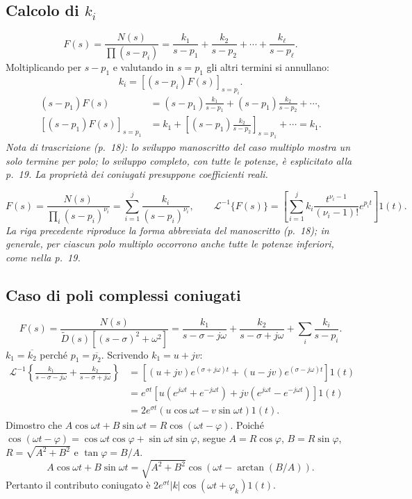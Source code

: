 \subsection*{Calcolo di $k_i$}
\[F(s)=\frac{N(s)}{\prod(s-p_i)}=\frac{k_1}{s-p_1}+\frac{k_2}{s-p_2}+\cdots+\frac{k_\ell}{s-p_\ell}.\]
Moltiplicando per $s-p_1$ e valutando in $s=p_1$ gli altri termini si annullano:
\[k_i=\left[(s-p_i)F(s)\right]_{s=p_i}.\]
\begin{align*}
(s-p_1)F(s)&=(s-p_1)\frac{k_1}{s-p_1}
 +(s-p_1)\frac{k_2}{s-p_2}+\cdots,\\
\left[(s-p_1)F(s)\right]_{s=p_1}
&=k_1+\left[(s-p_1)\frac{k_2}{s-p_2}\right]_{s=p_1}+\cdots=k_1.
\end{align*}
\emph{Nota di trascrizione (p.~18): lo sviluppo manoscritto del caso multiplo mostra un solo termine per polo; lo sviluppo completo, con tutte le potenze, è esplicitato alla p.~19. La proprietà dei coniugati presuppone coefficienti reali.}

\[F(s)=\frac{N(s)}{\prod_i(s-p_i)^{\nu_i}}
=\sum_{i=1}^j\frac{k_i}{(s-p_i)^{\nu_i}},\qquad
\mathcal L^{-1}\{F(s)\}=\left[\sum_{i=1}^j k_i\frac{t^{\nu_i-1}}{(\nu_i-1)!}e^{p_it}\right]1(t).\]
\emph{La riga precedente riproduce la forma abbreviata del manoscritto (p.~18); in generale, per ciascun polo multiplo occorrono anche tutte le potenze inferiori, come nella p.~19.}
\subsection*{Caso di poli complessi coniugati}
\[F(s)=\frac{N(s)}{\widetilde D(s)[(s-\sigma)^2+\omega^2]}=\frac{k_1}{s-\sigma-j\omega}+\frac{k_2}{s-\sigma+j\omega}+\sum_i\frac{k_i}{s-p_i}.\]
$k_1=\overline{k_2}$ perché $p_1=\overline{p_2}$. Scrivendo $k_1=u+jv$:
\begin{align*}
\mathcal L^{-1}\left\{\frac{k_1}{s-\sigma-j\omega}+\frac{k_2}{s-\sigma+j\omega}\right\}
&=[(u+jv)e^{(\sigma+j\omega)t}+(u-jv)e^{(\sigma-j\omega)t}]1(t)\\
&=e^{\sigma t}[u(e^{j\omega t}+e^{-j\omega t})+jv(e^{j\omega t}-e^{-j\omega t})]1(t)\\
&=2e^{\sigma t}(u\cos\omega t-v\sin\omega t)1(t).
\end{align*}
Dimostro che $A\cos\omega t+B\sin\omega t=R\cos(\omega t-\varphi)$. Poiché $\cos(\omega t-\varphi)=\cos\omega t\cos\varphi+\sin\omega t\sin\varphi$, segue $A=R\cos\varphi$, $B=R\sin\varphi$, $R=\sqrt{A^2+B^2}$ e $\tan\varphi=B/A$.
\[A\cos\omega t+B\sin\omega t=\sqrt{A^2+B^2}\cos(\omega t-\arctan(B/A)).\]
Pertanto il contributo coniugato è $2e^{\sigma t}|k|\cos(\omega t+\varphi_k)1(t)$.
